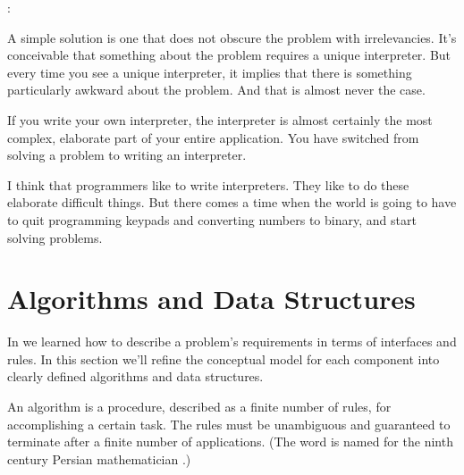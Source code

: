 \begin{interview}
:
\begin{tfquot}
A simple solution is one that does not obscure the problem with
irrelevancies.  It's conceivable that something about the problem requires
a unique interpreter. But every time you see a unique interpreter, it
implies that there is something particularly awkward about the problem.
And that is almost never the case.

If you write your own interpreter, the interpreter is almost certainly the
most complex, elaborate part of your entire application. You have switched
from solving a problem to writing an interpreter.

I think that programmers like to write interpreters. They like to do these
elaborate difficult things. But there comes a time when the world is going
to have to quit programming keypads and converting numbers to binary,
and start solving problems.
\end{tfquot}
\end{interview}%
%
%
%
%
%

\section{Algorithms and Data Structures}%
%

In  we learned how to describe a problem's requirements in terms
of interfaces and rules. In this section we'll refine the conceptual model
for each component into clearly defined algorithms and data structures.

An algorithm is a procedure, described as a finite number of rules, for
accomplishing a certain task. The rules must be unambiguous and guaranteed
to terminate after a finite number of applications. (The word is named for
the ninth century Persian mathematician .)

